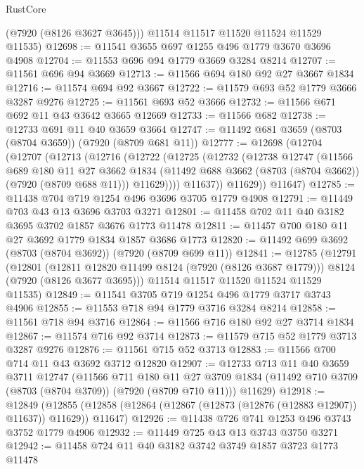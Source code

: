 \begin{lexlean}{RustCore}
\begin{coremodule}
        (@7920 (@8126 @3627 @3645)))
      @11514
      @11517
      @11520
      @11524
      @11529
      @11535)
@12698 := @11541 @3655 @697 @1255 @496 @1779 @3670 @3696 @4908
@12704 := @11553 @696 @94 @1779 @3669 @3284 @8214
@12707 := @11561 @696 @94 @3669
@12713 := @11566 @694 @180 @92 @27 @3667 @1834
@12716 := @11574 @694 @92 @3667
@12722 := @11579 @693 @52 @1779 @3666 @3287 @9276
@12725 := @11561 @693 @52 @3666
@12732 := @11566 @671 @692 @11 @43 @3642 @3665 @12669
@12733 := @11566 @682
@12738 := @12733 @691 @11 @40 @3659 @3664
@12747 := @11492 @681 @3659 (@8703 (@8704 @3659)) (@7920 (@8709 @681 @11))
@12777 := @12698
    (@12704
      (@12707
        (@12713
          (@12716
            (@12722
              (@12725
                (@12732
                  (@12738
                    @12747
                    (@11566
                      @689
                      @180
                      @11
                      @27
                      @3662
                      @1834
                      (@11492 @688 @3662 (@8703 (@8704 @3662)) (@7920 (@8709 @688 @11)))
                      @11629))))
              @11637))
          @11629))
      @11647)
@12785 := @11438 @704 @719 @1254 @496 @3696 @3705 @1779 @4908
@12791 := @11449 @703 @43 @13 @3696 @3703 @3271
@12801 := @11458 @702 @11 @40 @3182 @3695 @3702 @1857 @3676 @1773 @11478
@12811 := @11457 @700 @180 @11 @27 @3692 @1779 @1834 @1857 @3686 @1773
@12820 := @11492 @699 @3692 (@8703 (@8704 @3692)) (@7920 (@8709 @699 @11))
@12841 := @12785
    (@12791
      (@12801
        (@12811 @12820 @11499 @8124 (@7920 (@8126 @3687 @1779)))
        @8124
        (@7920 (@8126 @3677 @3695)))
      @11514
      @11517
      @11520
      @11524
      @11529
      @11535)
@12849 := @11541 @3705 @719 @1254 @496 @1779 @3717 @3743 @4906
@12855 := @11553 @718 @94 @1779 @3716 @3284 @8214
@12858 := @11561 @718 @94 @3716
@12864 := @11566 @716 @180 @92 @27 @3714 @1834
@12867 := @11574 @716 @92 @3714
@12873 := @11579 @715 @52 @1779 @3713 @3287 @9276
@12876 := @11561 @715 @52 @3713
@12883 := @11566 @700 @714 @11 @43 @3692 @3712 @12820
@12907 := @12733
    @713
    @11
    @40
    @3659
    @3711
    @12747
    (@11566
      @711
      @180
      @11
      @27
      @3709
      @1834
      (@11492 @710 @3709 (@8703 (@8704 @3709)) (@7920 (@8709 @710 @11)))
      @11629)
@12918 := @12849
    (@12855 (@12858 (@12864 (@12867 (@12873 (@12876 (@12883 @12907)) @11637)) @11629)) @11647)
@12926 := @11438 @726 @741 @1253 @496 @3743 @3752 @1779 @4906
@12932 := @11449 @725 @43 @13 @3743 @3750 @3271
@12942 := @11458 @724 @11 @40 @3182 @3742 @3749 @1857 @3723 @1773 @11478

\end{coremodule}
\end{lexlean}

